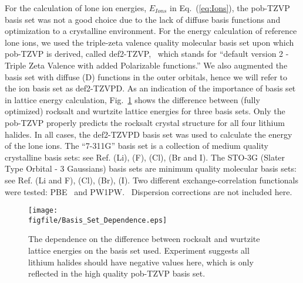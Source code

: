 \documentclass[titlepage,11pt]{article}
\newcommand{\figfile}{C:/Users/Hayden/Documents/Patey_Lab/ThesisCodeBase/Manuscript_1.0/figures}
\begin{document}
For the calculation of lone ion energies, $E_{Ions}$ in Eq.~(\ref{eq:Ions}), the pob-TZVP basis set was not a good choice due to the lack of diffuse basis functions and optimization to a crystalline environment. For the energy calculation of reference lone ions, we used the triple-zeta valence quality molecular basis set upon which pob-TZVP is derived, called def2-TZVP,~\cite{Rappoport2010,Peintinger2013} which stands for ``default version 2 - Triple Zeta Valence with added Polarizable functions.'' We also augmented the basis set with diffuse (D) functions in the outer orbitals, hence we will refer to the ion basis set as def2-TZVPD. As an indication of the importance of basis set in lattice energy calculation, Fig.~\ref{fig:basis_set} shows the difference between (fully optimized) rocksalt and wurtzite lattice energies for three basis sets. Only the pob-TZVP properly predicts the rocksalt crystal structure for all four lithium halides. In all cases, the def2-TZVPD basis set was used to calculate the energy of the lone ions. The ``7-311G'' basis set is a collection of medium quality crystalline basis sets: see Ref.  (Li),  (F),  (Cl),  (Br and I). The STO-3G (Slater Type Orbital - 3 Gaussians) basis sets are minimum quality molecular basis sets: see Ref.  (Li and F),  (Cl),  (Br),  (I). Two different exchange-correlation functionals were tested: PBE~\cite{Perdew1996} and PW1PW.~\cite{PW1PW} Dispersion corrections are not included here.

\begin{figure}
	\texttt{[image: \\figfile/Basis\_Set\_Dependence.eps]}
	\caption{\label{fig:basis_set} The dependence on the difference between rocksalt and wurtzite lattice energies on the basis set used. Experiment suggests all lithium halides should have negative values here, which is only reflected in the high quality pob-TZVP basis set.}
\end{figure}
\end{document}
